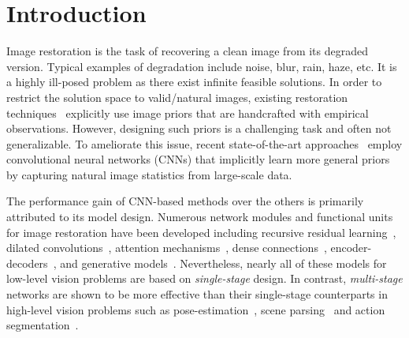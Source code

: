 \documentclass[10pt,twocolumn,letterpaper]{article}
\begin{document}
\vspace{-0.5em}
\section{Introduction}
Image restoration is the task of recovering a clean image from its degraded version. Typical examples of degradation include noise, blur, rain, haze, etc.  
It is a highly ill-posed problem as there exist infinite feasible solutions.
In order to restrict the solution space to valid/natural images, existing restoration techniques~\cite{dong2011image,he2010single,kim2010single,perona1990scale,roth2005fields,rudin1992nonlinear,zhu1997prior} explicitly use image priors that are handcrafted with empirical observations.
However, designing such priors is a challenging task and often not generalizable.
To ameliorate this issue, recent state-of-the-art approaches~\cite{dai2019second,SRResNet,pan2020exploiting,zamir2020cycleisp,zamir2020mirnet,DnCNN,zhang2017learning,zhang2020rdn} employ convolutional neural networks (CNNs) that implicitly learn more general priors by capturing natural image statistics from large-scale data. 


The performance gain of CNN-based methods over the others is primarily attributed to its model design. 
Numerous network modules and functional units for image restoration have been developed including recursive residual learning~\cite{RIDNet,RCAN}, dilated convolutions~\cite{RIDNet,yang2017deep}, attention mechanisms~\cite{dai2019second,zamir2020cycleisp,zhang2019residual}, dense connections~\cite{tong2017image,wang2018esrgan,zhang2020rdn}, encoder-decoders~\cite{Brooks2019,Chen2018, deblurganv2,ronneberger2015unet}, and generative models~\cite{SRResNet,qian2018attentive,zhang2019image,zhang2020dbgan}.
Nevertheless, nearly all of these models for low-level vision problems are based on \emph{single-stage} design.  
In contrast, \emph{multi-stage} networks are shown to be more effective than their single-stage counterparts in high-level vision problems such as pose-estimation~\cite{chen2018cascaded,li2019rethinking,newell2016stacked}, scene parsing~\cite{cheng2019spgnet} and action segmentation~\cite{farha2019ms,ghosh2020stacked,li2020ms}.
\end{document}

